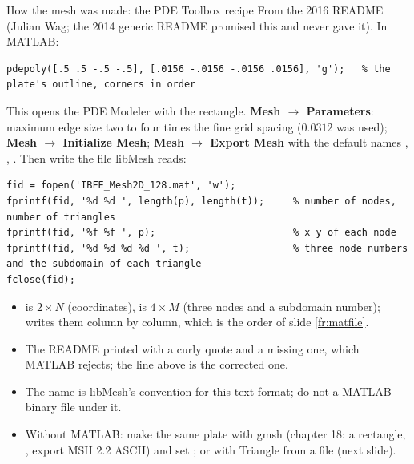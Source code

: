\documentclass[aspectratio=169,11pt]{beamer}
\begin{document}
\begin{frame}[fragile]{How the  mesh was made: the PDE Toolbox recipe}
\label{fr:pdetool}
\scriptsize
From the 2016 README (Julian Wag; the 2014 generic README promised this and never gave it). In MATLAB:
\begin{lstlisting}[style=matlab]
pdepoly([.5 .5 -.5 -.5], [.0156 -.0156 -.0156 .0156], 'g');   % the plate's outline, corners in order
\end{lstlisting}
This opens the PDE Modeler with the rectangle. \textbf{Mesh $\to$ Parameters}: maximum edge size two to four times the fine grid spacing ($0.0312$ was used); \textbf{Mesh $\to$ Initialize Mesh}; \textbf{Mesh $\to$ Export Mesh} with the default names , , . Then write the file libMesh reads:
\begin{lstlisting}[style=matlab]
fid = fopen('IBFE_Mesh2D_128.mat', 'w');
fprintf(fid, '%d %d ', length(p), length(t));     % number of nodes, number of triangles
fprintf(fid, '%f %f ', p);                        % x y of each node
fprintf(fid, '%d %d %d %d ', t);                  % three node numbers and the subdomain of each triangle
fclose(fid);
\end{lstlisting}
\begin{itemize}
  \item {} is $2\times N$ (coordinates),  is $4\times M$ (three nodes and a subdomain number);  writes them column by column, which is the order of slide \ref{fr:matfile}.
  \item The README printed  with a curly quote and a missing one, which MATLAB rejects; the line above is the corrected one.
  \item The  name is libMesh's convention for this text format; do not  a MATLAB binary file under it.
  \item Without MATLAB: make the same plate with gmsh (chapter 18: a rectangle, , export MSH 2.2 ASCII) and set ; or with Triangle from a  file (next slide).
\end{itemize}
\end{frame}
\end{document}

